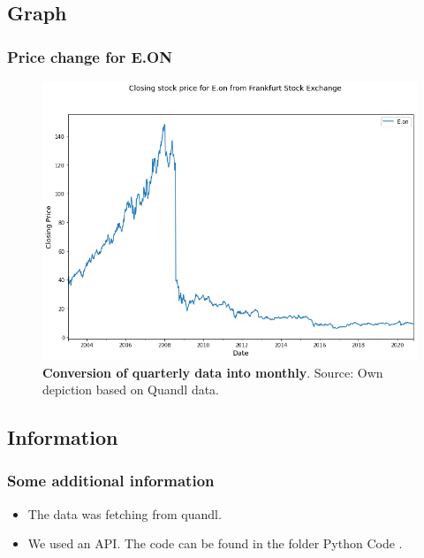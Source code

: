 \documentclass{beamer}
\begin{document}
\subsection{Graph}
\begin{frame}
\frametitle{Price change for E.ON}
	\begin{figure}[H]
	\includegraphics[scale=0.35]{images/Stock_Eon.png}
	\vspace{2mm}
	\caption[Price change for E.ON]{{\footnotesize \textbf{Conversion of quarterly data into monthly}. 
		{Source: Own depiction based on Quandl data.}}}
	\normalsize
	\label{fig:change_into_monthly}
\end{figure}

\end{frame}

\subsection{Information}
\begin{frame}
	\frametitle{Some additional information}
	\begin{itemize}
		\item The data was fetching from quandl.
		\item We used an API. The code can be found in the folder Python Code \cite{p1}.
		
	\end{itemize}
\end{frame}


\end{document}
